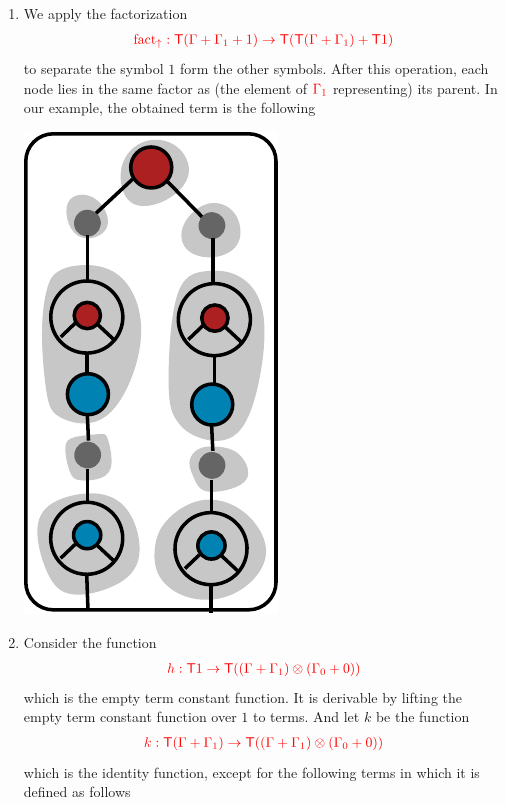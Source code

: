 \begin{example}
\begin{enumerate}
\begin{center}
		\end{center}
\item We apply the factorization 
\begin{align*}
{\color{red}{{\color{red}{\mathrm{fact_{\uparrow}}}}: {\color{red}{\mathsf T}}(\Gamma+\Gamma_1+1) \to {\color{red}{\mathsf T}}({\color{red}{\mathsf T}}(\Gamma+\Gamma_1)+{\color{red}{\mathsf T}}1)}}
\end{align*}
 to separate the symbol $1$ form the other symbols. After this operation, each node lies in the same factor as (the element of $\ranked{\Gamma_1}$ representing) its parent. In our example, the obtained term is the following
\begin{center}
		\includegraphics[scale=.5]{parent-block.pdf}
		\end{center}
\item Consider the function 
\begin{align*}
{\color{red}{h: {\color{red}{\mathsf T}}1 \to {\color{red}{\mathsf T}}((\Gamma+\Gamma_1)\otimes(\Gamma_0+0))}}
\end{align*}
which is the empty term constant function. It is derivable by lifting the empty term constant function over $1$ to terms.
And let $k$ be the function
\begin{align*}
{\color{red}{k: {\color{red}{\mathsf T}}(\Gamma+\Gamma_1) \to {\color{red}{\mathsf T}}((\Gamma+\Gamma_1)\otimes(\Gamma_0+0))}}
\end{align*}
which is the identity function, except for the following terms in which it is defined as follows
$$\begin{array}{rll}

\end{array}$$
\end{enumerate}
\end{example}
